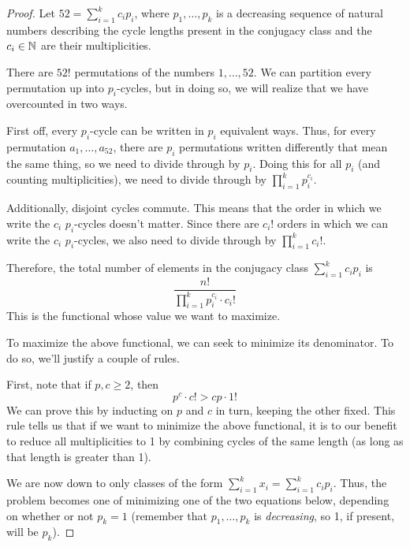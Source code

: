 \documentclass[../psets.tex]{subfiles}
\begin{document}
\begin{enumerate}
\begin{enumerate}
\begin{proof}
            Let $52=\sum_{i=1}^kc_ip_i$, where $p_1,\dots,p_k$ is a decreasing sequence of natural numbers describing the cycle lengths present in the conjugacy class and the $c_i\in\mathbb{N}$ are their multiplicities.\par\smallskip
            There are $52!$ permutations of the numbers $1,\dots,52$. We can partition every permutation up into $p_i$-cycles, but in doing so, we will realize that we have overcounted in two ways.\par
            First off, every $p_i$-cycle can be written in $p_i$ equivalent ways. Thus, for every permutation $a_1,\dots,a_{52}$, there are $p_i$ permutations written differently that mean the same thing, so we need to divide through by $p_i$. Doing this for all $p_i$ (and counting multiplicities), we need to divide through by $\prod_{i=1}^kp_i^{c_i}$.\par
            Additionally, disjoint cycles commute. This means that the order in which we write the $c_i$ $p_i$-cycles doesn't matter. Since there are $c_i!$ orders in which we can write the $c_i$ $p_i$-cycles, we also need to divide through by $\prod_{i=1}^kc_i!$.\par
            Therefore, the total number of elements in the conjugacy class $\sum_{i=1}^kc_ip_i$ is
            \begin{equation*}
                \frac{n!}{\prod_{i=1}^kp_i^{c_i}\cdot c_i!}
            \end{equation*}
            This is the functional whose value we want to maximize.\par\smallskip
            To maximize the above functional, we can seek to minimize its denominator. To do so, we'll justify a couple of rules.\par
            First, note that if $p,c\geq 2$, then
            \begin{equation*}
                p^c\cdot c! > cp\cdot 1!
            \end{equation*}
            We can prove this by inducting on $p$ and $c$ in turn, keeping the other fixed. This rule tells us that if we want to minimize the above functional, it is to our benefit to reduce all multiplicities to 1 by combining cycles of the same length (as long as that length is greater than 1).\par
            We are now down to only classes of the form $\sum_{i=1}^kx_i=\sum_{i=1}^kc_ip_i$. Thus, the problem becomes one of minimizing one of the two equations below, depending on whether or not $p_k=1$ (remember that $p_1,\dots,p_k$ is \emph{decreasing}, so 1, if present, will be $p_k$).

\end{proof}
\end{enumerate}
\end{enumerate}
\end{document}
